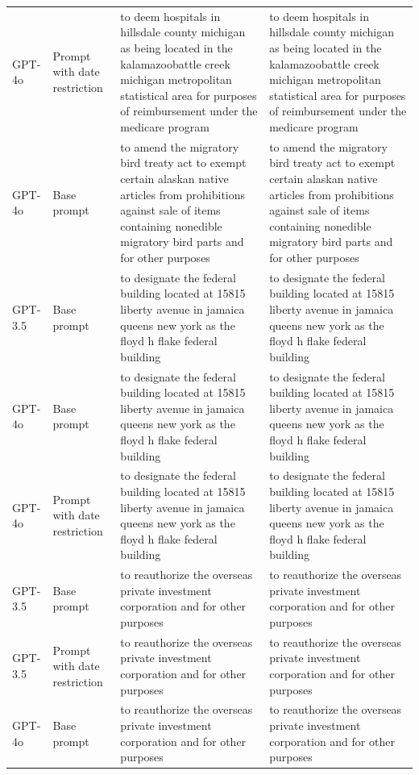 \begin{longtable}{>{\raggedright\arraybackslash}p{1.4cm}>{\raggedright\arraybackslash}p{1.4cm}>{\raggedright\arraybackslash}p{5.5cm}>{\raggedright\arraybackslash}p{5.5cm}}
GPT-4o & Prompt with date restriction & to deem hospitals in hillsdale county michigan as being located in the kalamazoobattle creek michigan metropolitan statistical area for purposes of reimbursement under the medicare program & to deem hospitals in hillsdale county michigan as being located in the kalamazoobattle creek michigan metropolitan statistical area for purposes of reimbursement under the medicare program\\
GPT-4o & Base prompt & to amend the migratory bird treaty act to exempt certain alaskan native articles from prohibitions against sale of items containing nonedible migratory bird parts and for other purposes & to amend the migratory bird treaty act to exempt certain alaskan native articles from prohibitions against sale of items containing nonedible migratory bird parts and for other purposes\\
GPT-3.5 & Base prompt & to designate the federal building located at 15815 liberty avenue in jamaica queens new york as the floyd h flake federal building & to designate the federal building located at 15815 liberty avenue in jamaica queens new york as the floyd h flake federal building\\
GPT-4o & Base prompt & to designate the federal building located at 15815 liberty avenue in jamaica queens new york as the floyd h flake federal building & to designate the federal building located at 15815 liberty avenue in jamaica queens new york as the floyd h flake federal building\\
GPT-4o & Prompt with date restriction & to designate the federal building located at 15815 liberty avenue in jamaica queens new york as the floyd h flake federal building & to designate the federal building located at 15815 liberty avenue in jamaica queens new york as the floyd h flake federal building\\
GPT-3.5 & Base prompt & to reauthorize the overseas private investment corporation and for other purposes & to reauthorize the overseas private investment corporation and for other purposes\\
GPT-3.5 & Prompt with date restriction & to reauthorize the overseas private investment corporation and for other purposes & to reauthorize the overseas private investment corporation and for other purposes\\
GPT-4o & Base prompt & to reauthorize the overseas private investment corporation and for other purposes & to reauthorize the overseas private investment corporation and for other purposes\\

\end{longtable}
